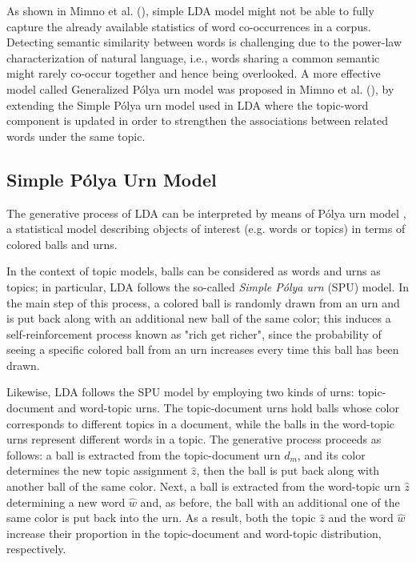\documentclass[letterpaper]{article}
\begin{document}
As shown in Mimno et al. (\citeyear{Mimno11}), simple LDA model might not be able to fully capture the already available statistics of word co-occurrences in a corpus. Detecting semantic similarity between words is challenging due to the power-law characterization of natural language, i.e., words sharing a common semantic might rarely co-occur together and hence being overlooked. %
A more effective model called Generalized P\'{o}lya urn model was proposed in Mimno et al. (\citeyear{Mimno11}), by extending the Simple P\'{o}lya urn model used in LDA where the topic-word component is updated in order to strengthen the associations between related words under the same topic.


\subsection{Simple P\'{o}lya Urn Model}
The generative process of LDA can be interpreted by means of P\'{o}lya urn model \cite{Mahmoud08}, a statistical model describing objects of interest (e.g. words or topics) in terms of colored balls and urns.

In the context of topic models, balls can be considered as words and urns as topics; in particular, LDA follows the so-called \textit{Simple P\'{o}lya urn} (SPU) model. In the main step of this process, a colored ball is randomly drawn from an urn and is put back along with an additional new ball of the same color; this induces a self-reinforcement process known as "rich get richer", since the probability of seeing a specific colored ball from an urn increases every time this ball has been drawn.

Likewise, LDA follows the SPU model by employing two kinds of urns: topic-document and word-topic urns. The topic-document urns hold balls whose color corresponds to different topics in a document, while the balls in the word-topic urns represent different words in a topic.
The generative process proceeds as follows: a ball is extracted from the topic-document urn $d_m$, and its color determines the new topic assignment $\hat{z}$, then the ball is put back along with another ball of the same color. Next, a ball is extracted from the word-topic urn $\hat{z}$ determining a new word $\hat{w}$ and, as before, the ball with an additional one of the same color is put back into the urn.
As a result, both the topic $\hat{z}$ and the word $\hat{w}$ increase their proportion in the topic-document and word-topic distribution, respectively.
\end{document}
